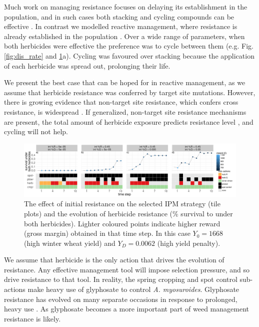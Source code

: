 \documentclass[9pt,twocolumn,twoside,lineno]{pnas-new}
\begin{document}
Much work on managing resistance focuses on delaying its establishment in the population, and in such cases both stacking and cycling compounds can be effective \citep{REX2013}. In contrast we modelled reactive management, where resistance is already established in the population \citep{Hick2018}. Over a wide range of parameters, when both herbicides were effective the preference was to cycle between them (e.g. Fig. \ref{fig:dis_rate} and \ref{fig:int_res}a). Cycling was favoured over stacking because the application of each herbicide was spread out, prolonging their life.

We present the best case that can be hoped for in reactive management, as we assume that herbicide resistance was conferred by target site mutations. However, there is growing evidence that non-target site resistance, which confers cross resistance, is widespread \citep{Hick2018}. If generalized, non-target site resistance mechanisms are present, the total amount of herbicide exposure predicts resistance level \citep{Hick2018}, and cycling will not help.
\begin{figure}[!ht]
	\includegraphics[width=178mm]{int_res_strat_resist.pdf}
	\caption{The effect of initial resistance on the selected IPM strategy (tile plots) and the evolution of herbicide resistance (\% survival to under both herbicides). Lighter coloured points indicate higher reward (gross margin) obtained in that time step. In this case $Y_0 = 1668$ (high winter wheat yield) and $Y_D = 0.0062$ (high yield penalty).}
	\label{fig:int_res} 
\end{figure}

We assume that herbicide is the only action that drives the evolution of resistance. Any effective management tool will impose selection pressure, and so drive resistance to that tool. In reality, the spring cropping and spot control sub-actions make heavy use of glyphosate to control \textit{A. myosuroides}. Glyphosate resistance has evolved on many separate occasions in response to prolonged, heavy use \citep{Samm2014}. As glyphosate becomes a more important part of weed management \citep{Hick2018} resistance is likely. 
\end{document}
